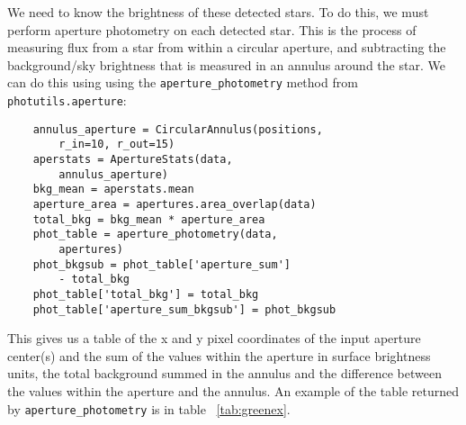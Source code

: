 \documentclass[twocolumn]{article}
\begin{document}
We need to know the brightness of these detected stars. To do this, we must perform aperture photometry on each detected star. This is the process of measuring flux from a star from within a circular aperture, and subtracting the background/sky brightness that is measured in an annulus around the star. We can do this using using the \verb|aperture_photometry| method from \verb|photutils.aperture|:
\begin{verbatim}
    annulus_aperture = CircularAnnulus(positions, 
        r_in=10, r_out=15)
    aperstats = ApertureStats(data, 
        annulus_aperture)
    bkg_mean = aperstats.mean
    aperture_area = apertures.area_overlap(data)
    total_bkg = bkg_mean * aperture_area
    phot_table = aperture_photometry(data, 
        apertures)
    phot_bkgsub = phot_table['aperture_sum'] 
        - total_bkg
    phot_table['total_bkg'] = total_bkg
    phot_table['aperture_sum_bkgsub'] = phot_bkgsub
\end{verbatim}
This gives us a table of the x and y pixel coordinates of the input aperture center(s) and the sum of the values within the aperture in surface brightness units, the total background summed in the annulus and the difference between the values within the aperture and the annulus. An example of the table returned by \verb|aperture_photometry| is in table ~\ref{tab:greenex}.
\end{document}
